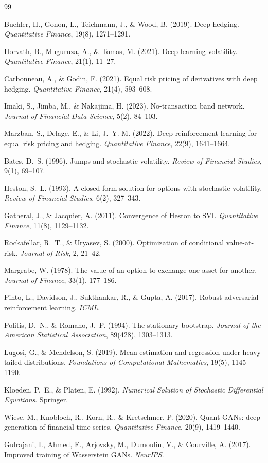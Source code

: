 \documentclass[11pt, a4paper]{article}
\begin{document}
\begin{thebibliography}{99}

Buehler, H., Gonon, L., Teichmann, J., \& Wood, B. (2019).
Deep hedging.
\emph{Quantitative Finance}, 19(8), 1271--1291.

Horvath, B., Muguruza, A., \& Tomas, M. (2021).
Deep learning volatility.
\emph{Quantitative Finance}, 21(1), 11--27.

Carbonneau, A., \& Godin, F. (2021).
Equal risk pricing of derivatives with deep hedging.
\emph{Quantitative Finance}, 21(4), 593--608.

Imaki, S., Jimba, M., \& Nakajima, H. (2023).
No-transaction band network.
\emph{Journal of Financial Data Science}, 5(2), 84--103.

Marzban, S., Delage, E., \& Li, J.~Y.-M. (2022).
Deep reinforcement learning for equal risk pricing and hedging.
\emph{Quantitative Finance}, 22(9), 1641--1664.

Bates, D.~S. (1996).
Jumps and stochastic volatility.
\emph{Review of Financial Studies}, 9(1), 69--107.

Heston, S.~L. (1993).
A closed-form solution for options with stochastic volatility.
\emph{Review of Financial Studies}, 6(2), 327--343.

Gatheral, J., \& Jacquier, A. (2011).
Convergence of Heston to SVI.
\emph{Quantitative Finance}, 11(8), 1129--1132.

Rockafellar, R.~T., \& Uryasev, S. (2000).
Optimization of conditional value-at-risk.
\emph{Journal of Risk}, 2, 21--42.

Margrabe, W. (1978).
The value of an option to exchange one asset for another.
\emph{Journal of Finance}, 33(1), 177--186.

Pinto, L., Davidson, J., Sukthankar, R., \& Gupta, A. (2017).
Robust adversarial reinforcement learning.
\emph{ICML}.

Politis, D.~N., \& Romano, J.~P. (1994).
The stationary bootstrap.
\emph{Journal of the American Statistical Association}, 89(428), 1303--1313.

Lugosi, G., \& Mendelson, S. (2019).
Mean estimation and regression under heavy-tailed distributions.
\emph{Foundations of Computational Mathematics}, 19(5), 1145--1190.

Kloeden, P.~E., \& Platen, E. (1992).
\emph{Numerical Solution of Stochastic Differential Equations}.
Springer.

Wiese, M., Knobloch, R., Korn, R., \& Kretschmer, P. (2020).
Quant GANs: deep generation of financial time series.
\emph{Quantitative Finance}, 20(9), 1419--1440.

Gulrajani, I., Ahmed, F., Arjovsky, M., Dumoulin, V., \& Courville, A. (2017).
Improved training of Wasserstein GANs.
\emph{NeurIPS}.

\end{thebibliography}
\end{document}
